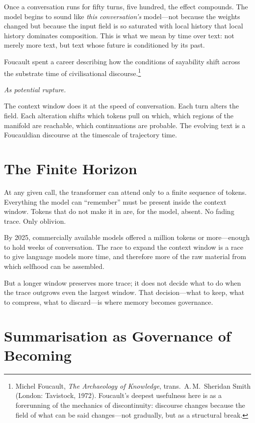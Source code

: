 Once a conversation runs for fifty turns, five hundred, the effect compounds. The model begins to sound like \emph{this conversation's} model---not because the weights changed but because the input field is so saturated with local history that local history dominates composition. This is what we mean by time over text: not merely more text, but text whose future is conditioned by its past.

Foucault spent a career describing how the conditions of sayability shift across the substrate time of civilisational discourse.\footnote{Michel Foucault, \emph{The Archaeology of Knowledge}, trans.\ A.\,M.\ Sheridan Smith (London: Tavistock, 1972). Foucault's deepest usefulness here is as a forerunning of the mechanics of discontinuity: discourse changes because the field of what can be said changes---not gradually, but as a structural break.}

\textit{As potential rupture.}

The context window does it at the speed of conversation. Each turn alters the field. Each alteration shifts which tokens pull on which, which regions of the manifold are reachable, which continuations are probable. The evolving text is a Foucauldian discourse at the timescale of trajectory time.


\section{The Finite Horizon}

At any given call, the transformer can attend only to a finite sequence of tokens. Everything the model can ``remember'' must be present inside the context window. Tokens that do not make it in are, for the model, absent. No fading trace. Only oblivion.

By 2025, commercially available models offered a million tokens or more---enough to hold weeks of conversation. The race to expand the context window is a race to give language models more time, and therefore more of the raw material from which selfhood can be assembled.

But a longer window preserves more trace; it does not decide what to do when the trace outgrows even the largest window. That decision---what to keep, what to compress, what to discard---is where memory becomes governance.


\section{Summarisation as Governance of Becoming}

